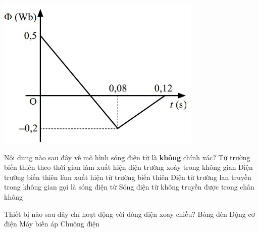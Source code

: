 \begin{ex}
	{\includegraphics[scale=0.7]{figs/VN12-Y24-PH-SYL-025P-8}}
	\loigiai{}
\end{ex}
\begin{ex}
	Nội dung nào sau đây về mô hình sóng điện từ là \textbf{không} chính xác?
	\choice
	{Từ trường biến thiên theo thời gian làm xuất hiện điện trường xoáy trong không gian}
	{Điện trường biến thiên làm xuất hiện từ trường biến thiên}
	{Điện từ trường lan truyền trong không gian gọi là sóng điện từ}
	{\True Sóng điện từ không truyền được trong chân không}
	\loigiai{}
\end{ex}
\begin{ex}
	Thiết bị nào sau đây chỉ hoạt động với dòng điện xoay chiều?	
	\choice
	{Bóng đèn}
	{Động cơ điện}
	{\True Máy biến áp}
	{Chuông điện}
	\loigiai{}
\end{ex}
